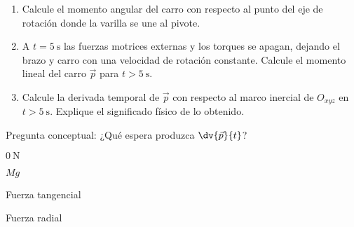 \documentclass[11pt,spanish,a4paper]{article}
\begin{document}
\begin{enumerate}
\begin{enumerate}[label=\alph*)]
	\item Calcule el momento angular del carro con respecto al punto del eje de rotación donde la varilla se une al pivote.
	\item A $t= \SI{5}{\second}$ las fuerzas motrices externas y los torques se apagan, dejando el brazo y carro con una velocidad de rotación constante.
	Calcule el momento lineal del carro $\vec{p}$ para $t>\SI{5}{\second}$.
	\item Calcule la derivada temporal de $\vec{p}$ con respecto al marco inercial de $O_{xyz}$ en $t> \SI{5}{\second}$.
	Explique el significado físico de lo obtenido.
\end{enumerate}

Pregunta conceptual:
¿Qué espera produzca $\dv{\vec{p}}{t}$?
\begin{enumerate*}[label=\alph*),itemjoin={,\quad}]
	\item $\SI{0}{\newton}$
	\item $M g$
	\item Fuerza tangencial
	\item Fuerza radial
\end{enumerate*}


\end{enumerate}
\end{document}
